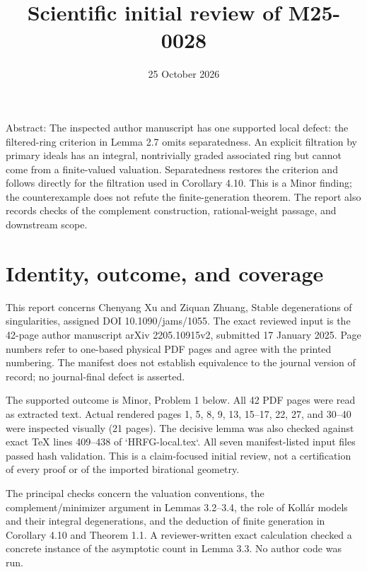 \documentclass[10pt]{article}
\title{Scientific initial review of M25-0028}
\author{}
\date{25 October 2026}
\begin{document}
\maketitle
Abstract: The inspected author manuscript has one supported local defect: the filtered-ring criterion in Lemma 2.7 omits separatedness. An explicit filtration by primary ideals has an integral, nontrivially graded associated ring but cannot come from a finite-valued valuation. Separatedness restores the criterion and follows directly for the filtration used in Corollary 4.10. This is a Minor finding; the counterexample does not refute the finite-generation theorem. The report also records checks of the complement construction, rational-weight passage, and downstream scope.\par
\section*{Identity, outcome, and coverage}
This report concerns Chenyang Xu and Ziquan Zhuang, Stable degenerations of singularities, assigned DOI 10.1090/jams/1055. The exact reviewed input is the 42-page author manuscript arXiv 2205.10915v2, submitted 17 January 2025. Page numbers refer to one-based physical PDF pages and agree with the printed numbering. The manifest does not establish equivalence to the journal version of record; no journal-final defect is asserted.\par
The supported outcome is Minor, Problem 1 below. All 42 PDF pages were read as extracted text. Actual rendered pages 1, 5, 8, 9, 13, 15–17, 22, 27, and 30–40 were inspected visually (21 pages). The decisive lemma was also checked against exact TeX lines 409–438 of `HRFG-local.tex`. All seven manifest-listed input files passed hash validation. This is a claim-focused initial review, not a certification of every proof or of the imported birational geometry.\par
The principal checks concern the valuation conventions, the complement/minimizer argument in Lemmas 3.2–3.4, the role of Kollár models and their integral degenerations, and the deduction of finite generation in Corollary 4.10 and Theorem 1.1. A reviewer-written exact calculation checked a concrete instance of the asymptotic count in Lemma 3.3. No author code was run.\par
\end{document}
